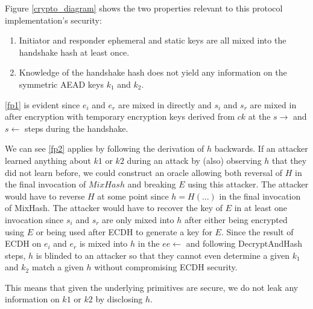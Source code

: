 \documentclass[12pt,a4paper,notitlepage]{article}
\begin{document}
Figure \ref{crypto_diagram} shows the two properties relevant to this protocol implementation's security:
\begin{enumerate}
\item Initiator and responder ephemeral and static keys are all mixed into the handshake hash at least once.\label{fp1}
\item Knowledge of the handshake hash does not yield any information on the symmetric AEAD keys $k_1$ and $k_2$.\label{fp2}
\end{enumerate}

\ref{fp1} is evident since $e_i$ and $e_r$ are mixed in directly and $s_i$ and $s_r$ are mixed in after encryption with
temporary encryption keys derived from $ck$ at the $s\rightarrow$ and $s\leftarrow$ steps
during the handshake.

We can see \ref{fp2} applies by following the derivation of $h$ backwards. If an attacker learned anything about $k1$ or
$k2$ during an attack by (also) observing $h$ that they did not learn before, we could construct an oracle allowing both
reversal of $H$ in the final invocation of $MixHash$ and breaking $E$ using this attacker. The attacker would have to
reverse $H$ at some point since $h = H(\hdots)$ in the final invocation of MixHash. The attacker would have to recover
the key of $E$ in at least one invocation since $s_i$ and $s_r$ are only mixed into $h$ after either being encrypted
using $E$ or being used after ECDH to generate a key for $E$. Since the result of ECDH on $e_i$ and $e_r$ is mixed into
$h$ in the $ee\leftarrow$ and following DecryptAndHash steps, $h$ is blinded to an attacker so that they cannot even
determine a given $k_1$ and $k_2$ match a given $h$ without compromising ECDH security.

This means that given the underlying primitives are secure, we do not leak any information on $k1$ or $k2$ by disclosing
$h$.
\end{document}
